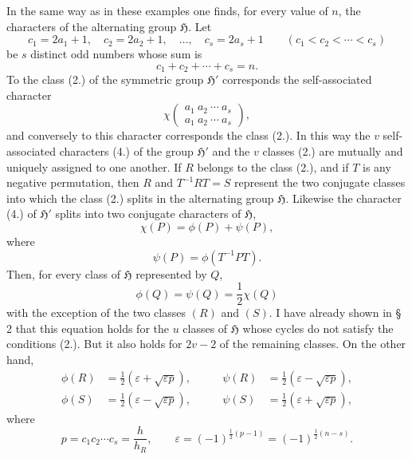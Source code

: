 \documentclass[11pt]{article}
\newcommand{\Hgr}{\mathfrak{H}}
\newcommand{\eps}{\varepsilon}
\newcommand{\ch}[2]{\left(\begin{smallmatrix}#1\\#2\end{smallmatrix}\right)}
\begin{document}
In the same way as in these examples one finds, for every value of $n$, the characters of the alternating group $\Hgr$. Let
\begin{equation}\tag{2.}
 c_1=2a_1+1,	\quad c_2=2a_2+1,	\quad \ldots,	\quad c_s=2a_s+1\qquad(c_1<c_2<\cdots<c_s)
\end{equation}
be $s$ distinct odd numbers whose sum is
\begin{equation}\tag{3.}
 c_1+c_2+\cdots+c_s=n.
\end{equation}
To the class (2.) of the symmetric group $\Hgr'$ corresponds the self-associated character
\begin{equation}\tag{4.}
 \chi\ch{a_1\ a_2\ \cdots\ a_s}{a_1\ a_2\ \cdots\ a_s},
\end{equation}
and conversely to this character corresponds the class (2.). In this way the $v$ self-associated characters (4.) of the group $\Hgr'$ and the $v$ classes (2.) are mutually and uniquely assigned to one another. If $R$ belongs to the class (2.), and if $T$ is any negative permutation, then $R$ and $T^{-1}RT=S$ represent the two conjugate classes into which the class (2.) splits in the alternating group $\Hgr$. Likewise the character (4.) of $\Hgr'$ splits into two conjugate characters of $\Hgr$,
\begin{equation}\tag{5.}
 \chi(P)=\phi(P)+\psi(P),
\end{equation}
where
\[
 \psi(P)=\phi(T^{-1}PT).
\]
Then, for every class of $\Hgr$ represented by $Q$,
\begin{equation}\tag{6.}
 \phi(Q)=\psi(Q)=\frac12\chi(Q)
\end{equation}
with the exception of the two classes $(R)$ and $(S)$. I have already shown in § 2 that this equation holds for the $u$ classes of $\Hgr$ whose cycles do not satisfy the conditions (2.). But it also holds for $2v-2$ of the remaining classes. On the other hand,
\begin{equation}\tag{7.}
\begin{aligned}
 \phi(R)&=\frac12(\eps+\sqrt{\eps p}),&\qquad \psi(R)&=\frac12(\eps-\sqrt{\eps p}),\\
 \phi(S)&=\frac12(\eps-\sqrt{\eps p}),&\qquad \psi(S)&=\frac12(\eps+\sqrt{\eps p}),
\end{aligned}
\end{equation}
where
\begin{equation}\tag{8.}
 p=c_1c_2\cdots c_s=\frac{h}{h_R},	\qquad \eps=(-1)^{\frac12(p-1)}=(-1)^{\frac12(n-s)}.
\end{equation}
\end{document}
